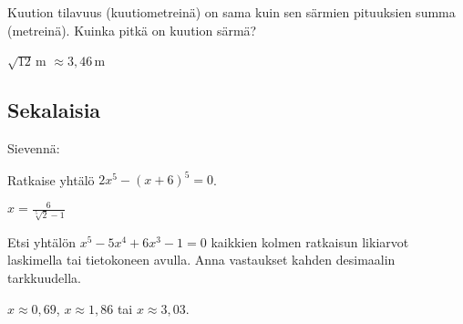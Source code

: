 \begin{tehtavasivu}
\begin{tehtava} 
Kuution tilavuus (kuutiometreinä) on sama kuin sen särmien pituuksien summa (metreinä). Kuinka pitkä on kuution särmä?
    \begin{vastaus}
		$\sqrt{12}$\,m $\approx 3,46$\,m
    \end{vastaus}
\end{tehtava}

\subsection*{Sekalaisia}

\begin{tehtava} 
Sievennä:
		\begin{alakohdat}
		\end{alakohdat}
	\begin{vastaus}
		\begin{alakohdat}
			\alakohta{$0$}
			\alakohta{$(x-y)^2$}
		\end{alakohdat}
    \end{vastaus}
\end{tehtava}

\begin{tehtava} 
Ratkaise yhtälö
$2x^5-(x+6)^5=0$.
    \begin{vastaus}
	$x=\frac{6}{\sqrt[5]{2}-1}$
    \end{vastaus}
\end{tehtava}


\begin{tehtava} %
Etsi yhtälön $x^5-5x^4+6x^3-1=0$ kaikkien kolmen ratkaisun likiarvot laskimella tai tietokoneen avulla. Anna vastaukset kahden desimaalin tarkkuudella.
    \begin{vastaus}
	$x \approx 0,69$, $x \approx 1,86$ tai $x \approx 3,03$.
    \end{vastaus}
\end{tehtava}

\end{tehtavasivu}